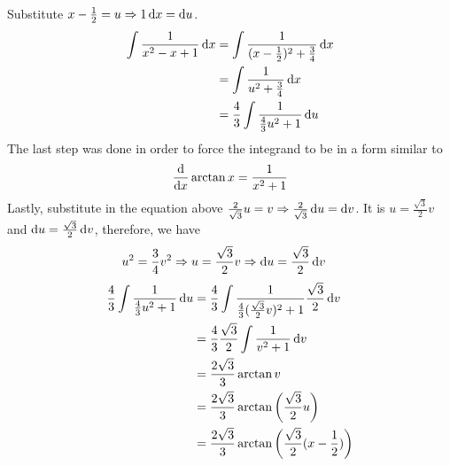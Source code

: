 \begin{solution}
    Substitute \(x - \frac{1}{2} = u \Rightarrow 1 \mathop{}\!\mathrm{d} x = \mathop{}\!\mathrm{d} u\).
    \begin{align}
        \int \frac{1}{x^2 -x + 1} \mathop{}\!\mathrm{d} x &= \int \frac{1}{(x - \frac{1}{2})^2 + \frac{3}{4}} \mathop{}\!\mathrm{d} x\\
        &= \int \frac{1}{u^2 + \frac{3}{4}} \mathop{}\!\mathrm{d} x \\
        &= \frac{4}{3} \int \frac{1}{\frac{4}{3} u^2 + 1} \mathop{}\!\mathrm{d} u
    \end{align}
    The last step was done in order to force the integrand to be in a form similar to
    \begin{align}
        \frac{\mathop{}\!\mathrm{d}}{\mathop{}\!\mathrm{d} x} \arctan x = \frac{1}{x^2 + 1}
    \end{align}
    Lastly, substitute in the equation above \(\frac{2}{\sqrt{3}} u = v \Rightarrow \frac{2}{\sqrt{3}} \mathop{}\!\mathrm{d} u = \mathop{}\!\mathrm{d} v\). It is \(u = \frac{\sqrt{3}}{2} v\) and \(\mathop{}\!\mathrm{d} u = \frac{\sqrt{3}}{2} \mathop{}\!\mathrm{d} v\), therefore, we have
    \begin{align}
        u^2 = \frac{3}{4} v^2 &\Rightarrow u = \frac{\sqrt{3}}{2} v\Rightarrow \mathop{}\!\mathrm{d} u = \frac{\sqrt{3}}{2} \mathop{}\!\mathrm{d} v
    \end{align}
    \begin{align}
        \frac{4}{3} \int \frac{1}{\frac{4}{3} u^2 + 1} \mathop{}\!\mathrm{d} u &= \frac{4}{3} \int \frac{1}{\frac{4}{3} (\frac{\sqrt{3}}{2}v)^2 + 1} \frac{\sqrt{3}}{2} \mathop{}\!\mathrm{d} v \\
        &= \frac{4}{3} \frac{\sqrt{3}}{2} \int \frac{1}{v^2 + 1} \mathop{}\!\mathrm{d} v \\
        &= \frac{2 \sqrt{3}}{3} \arctan v  \\
        &= \frac{2 \sqrt{3}}{3} \arctan \left( \frac{\sqrt{3}}{2}u \right) \\
        &= \frac{2  \sqrt{3}}{3} \arctan \left( \frac{\sqrt{3}}{2}(x - \frac{1}{2})\right)
    \end{align}
\end{solution}
